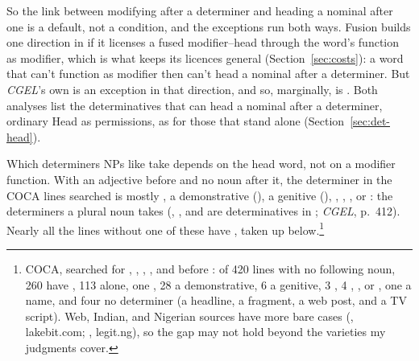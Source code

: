 So the link between modifying after a determiner and heading a nominal after one is a default, not a condition, and the exceptions run both ways. Fusion builds one direction in if it licenses a fused modifier--head through the word's function as modifier, which is what keeps its licences general (Section~\ref{sec:costs}): a word that can't function as modifier then can't head a nominal after a determiner. But \textit{CGEL}'s own  is an exception in that direction, and so, marginally, is . Both analyses list the determinatives that can head a nominal after a determiner, ordinary Head as permissions, as for those that stand alone (Section~\ref{sec:det-head}).

Which determiners NPs like  take depends on the head word, not on a modifier function. With an adjective before  and no noun after it, the determiner in the COCA lines searched is mostly , a demonstrative (), a genitive (), , , , or : the determiners a plural noun takes (, , and  are determinatives in ; \textit{CGEL}, p.~412). Nearly all the lines without one of these have , taken up below.\footnote{COCA, searched for , , , , and  before : of 420 lines with no following noun, 260 have , 113  alone, one , 28 a demonstrative, 6 a genitive, 3 , 4 , , or , one a name, and four no determiner (a headline, a fragment, a web post, and a TV script). Web, Indian, and Nigerian sources have more bare cases (, lakebit.com; , legit.ng), so the gap may not hold beyond the varieties my judgments cover.}


